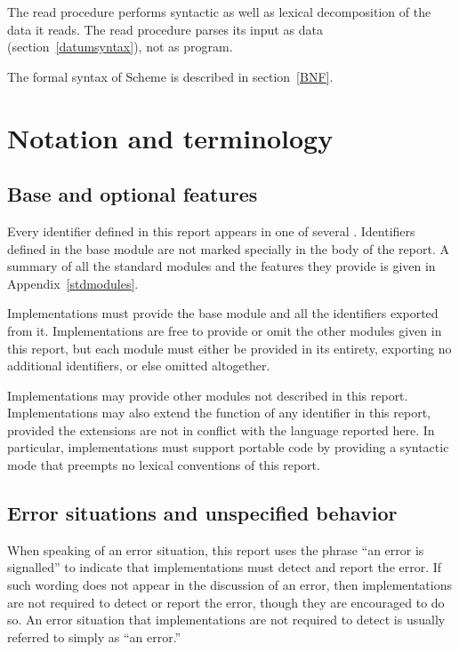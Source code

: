 The {\cf read} procedure performs syntactic as well as lexical decomposition of
the data it reads.  The {\cf read} procedure parses its input as data
(section~\ref{datumsyntax}), not as program.

The formal syntax of Scheme is described in section~\ref{BNF}.


\section{Notation and terminology}


\subsection{Base and optional features}
\label{qualifiers}

Every identifier defined in this report appears in one of several
.  Identifiers defined in the {\cf base} module
are not marked specially in the body of the report.  A summary of
all the standard modules and the features they provide is given in
Appendix~\ref{stdmodules}.

Implementations must provide the {\cf base} module and all the identifiers
exported from it.  Implementations are free to provide or omit the other
modules given in this report, but each module must either be provided
in its entirety, exporting no additional identifiers, or else omitted
altogether.

Implementations may provide other modules not described in this report.
Implementations may also extend the function of any identifier in this
report, provided the extensions are not in conflict with the language
reported here.  In particular, implementations must support portable
code by providing a syntactic mode that preempts no lexical conventions
of this report.

\subsection{Error situations and unspecified behavior}

When speaking of an error situation, this report uses the phrase ``an
error is signalled'' to indicate that implementations must detect and
report the error.  If such wording does not appear in the discussion of
an error, then implementations are not required to detect or report the
error, though they are encouraged to do so.  An error situation that
implementations are not required to detect is usually referred to simply
as ``an error.''

